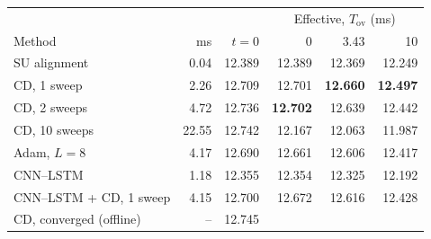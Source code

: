 \begin{tabular}{lrr|rrr}
\toprule
 & & & \multicolumn{3}{c}{Effective, $T_{\mathrm{ov}}$ (ms)} \\
Method & ms & $t{=}0$ & 0 & 3.43 & 10 \\
\midrule
SU alignment & 0.04 & 12.389 & 12.389 & 12.369 & 12.249 \\
CD, 1 sweep & 2.26 & 12.709 & 12.701 & \textbf{12.660} & \textbf{12.497} \\
CD, 2 sweeps & 4.72 & 12.736 & \textbf{12.702} & 12.639 & 12.442 \\
CD, 10 sweeps & 22.55 & 12.742 & 12.167 & 12.063 & 11.987 \\
Adam, $L{=}8$ & 4.17 & 12.690 & 12.661 & 12.606 & 12.417 \\
CNN--LSTM & 1.18 & 12.355 & 12.354 & 12.325 & 12.192 \\
CNN--LSTM + CD, 1 sweep & 4.15 & 12.700 & 12.672 & 12.616 & 12.428 \\
\midrule
CD, converged (offline) & -- & 12.745 & & & \\
\bottomrule
\end{tabular}
